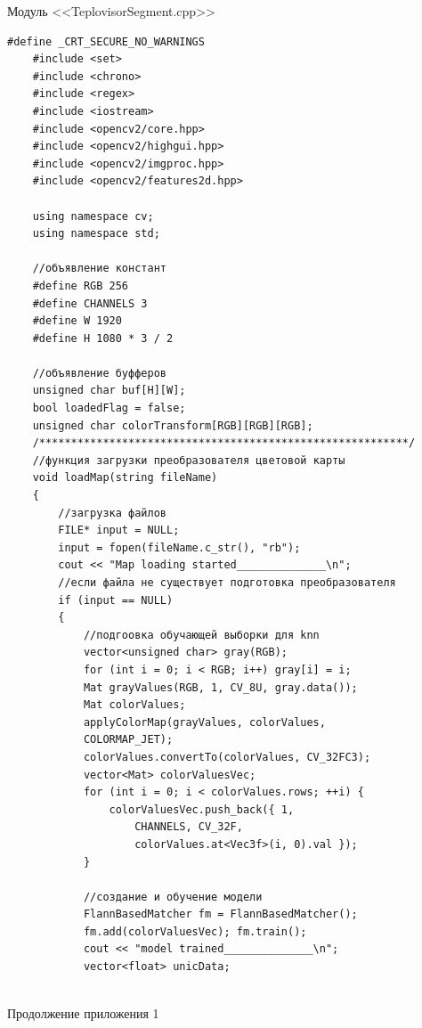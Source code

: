 \documentclass[14pt, a4paper]{extreport}
\begin{document}
\begin{center} {Модуль <<TeplovisorSegment.cpp>>}
\end{center}

\begin{Verbatim}[fontseries=c, fontsize=\fontsize{10pt}{12pt}\selectfont]
	#define _CRT_SECURE_NO_WARNINGS
	#include <set>
	#include <chrono>
	#include <regex>
	#include <iostream>
	#include <opencv2/core.hpp>
	#include <opencv2/highgui.hpp>
	#include <opencv2/imgproc.hpp>
	#include <opencv2/features2d.hpp>
	
	using namespace cv;
	using namespace std;
	
	//объявление констант
	#define RGB 256
	#define CHANNELS 3
	#define W 1920
	#define H 1080 * 3 / 2
	
	//объявление буфферов
	unsigned char buf[H][W];
	bool loadedFlag = false;
	unsigned char colorTransform[RGB][RGB][RGB];
	/**********************************************************/
	//функция загрузки преобразователя цветовой карты
	void loadMap(string fileName)
	{
		//загрузка файлов
		FILE* input = NULL;
		input = fopen(fileName.c_str(), "rb");
		cout << "Map loading started______________\n";
		//если файла не существует подготовка преобразователя
		if (input == NULL)
		{
			//подгоовка обучающей выборки для knn
			vector<unsigned char> gray(RGB);
			for (int i = 0; i < RGB; i++) gray[i] = i;
			Mat grayValues(RGB, 1, CV_8U, gray.data());
			Mat colorValues;
			applyColorMap(grayValues, colorValues, 
			COLORMAP_JET);
			colorValues.convertTo(colorValues, CV_32FC3);
			vector<Mat> colorValuesVec;
			for (int i = 0; i < colorValues.rows; ++i) {
				colorValuesVec.push_back({ 1, 
					CHANNELS, CV_32F,
					colorValues.at<Vec3f>(i, 0).val });
			}
			
			//создание и обучение модели
			FlannBasedMatcher fm = FlannBasedMatcher();
			fm.add(colorValuesVec); fm.train();
			cout << "model trained______________\n";
			vector<float> unicData;
			
\end{Verbatim}
\noindent Продолжение приложения 1
\end{document}
